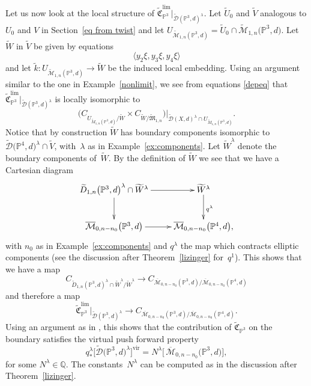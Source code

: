 \documentclass[pdftex]{sigma}
\numberwithin{equation}{section}
\newcommand{\vv}{\mathrm{vir}}
\newcommand{\PP}{\mathbb P}
\theoremstyle{plain}
\theoremstyle{definition}
\theoremstyle{remark}
\begin{document}
\begin{Remark}
Let us now look at the local structure of $\widetilde{\mathfrak{C}}_{\PP^3}^{\mathrm{lim}}|_{\widetilde{\mathcal{D}}(\PP^3,d)^{\lambda}}$. Let $\widetilde{U}_0$ and $\widetilde{V}$ analogous to $U_0$ and $V$ in Section~\ref{eq from twist} and let $U_{\widetilde{\mathcal{M}}_{1,n}(\PP^3,d)}=\widetilde{U}_0\cap \widetilde{\mathcal{M}}_{1,n}\big(\PP^3,d\big)$. Let $\widetilde{W}$ in $\widetilde{V}$ be given by equations
\[\langle y_2\xi,y_3\xi,y_4\xi \rangle
\]
and let $\tilde{k}\colon U_{\widetilde{\mathcal{M}}_{1,n}(\PP^3,d)}\to \widetilde{W}$ be the induced local embedding. Using an argument similar to the one in Example~\ref{nonlimit}, we see from equations \ref{depeq} that $\widetilde{\mathfrak{C}}_{\PP^3}^{\mathrm{lim}}|_{\widetilde{\mathcal{D}}(\PP^3,d)^{\lambda}}$ is locally isomorphic to
\[
\big(C_{U_{\widetilde{M}_{1,n}(\PP^3,d)}/\widetilde{W}}\times C_{\widetilde{W}/\widetilde{\mathfrak{M}}_{1,n}}\big)|_{\widetilde{\mathcal{D}}(X,d)^{\lambda}\cap U_{\widetilde{M}_{1,n}(\PP^3,d)}}.
\]
Notice that by construction $\widetilde{W}$ has boundary components isomorphic to $\widetilde{\mathcal{D}}\big(\PP^4,d\big)^{\lambda}\cap \widetilde{V}$, with~$\lambda$ as in Example~\ref{ex:components}. Let $\widetilde{W}^{\lambda}$ denote the boundary components of~$\widetilde{W}$. By the definition of $\widetilde{W}$ we see that we have a Cartesian diagram
\[\xymatrix{
\widetilde{D}_{1,n}\big(\PP^3,d\big)^{\lambda}\cap \widetilde{W}^{\lambda}\ar[r]\ar[d] &\widetilde{W}^{\lambda}\ar[d]^{q^{\lambda}}\\
\overline{\mathcal{M}}_{0,n-n_0}\big(\PP^3,d\big)\ar[r]&\overline{\mathcal{M}}_{0,n-n_0}\big(\PP^4,d\big),
}
\]
with $n_0$ as in Example~\ref{ex:components} and $q^{\lambda}$ the map which contracts elliptic components (see the discussion after Theorem~\ref{lizinger} for~$q^1$). This shows that we have a map
\[C_{\widetilde{D}_{1,n}(\PP^3,d)^{\lambda}\cap \widetilde{W}^{\lambda}/\widetilde{W}^{\lambda}}\to C_{\overline{\mathcal{M}}_{0,n-n_0}(\PP^3,d)/\overline{\mathcal{M}}_{0,n-n_0}(\PP^4,d)}
\]
and therefore a map
\[
\widetilde{\mathfrak{C}}^{\mathrm{lim}}_{\PP^3}|_{\widetilde{\mathcal{D}}(\PP^3,d)^{\lambda}}\to C_{\overline{\mathcal{M}}_{0,n-n_0}(\PP^3,d)/\overline{\mathcal{M}}_{0,n-n_0}(\PP^4,d)}.
\]
Using an argument as in \cite[Lemma~4.4]{vir-push}, this shows that the contribution of $\widetilde{\mathfrak{C}}_{\PP^3}$ on the boundary satisfies the virtual push forward property
\[q^{\lambda}_*\big[\widetilde{\mathcal{D}}\big(\PP^3,d\big)^{\lambda}\big]^{\vv}=N^{\lambda} \big[\,\overline{\mathcal{M}}_{0,n-n_0}\big(\PP^3,d\big)\big],
\]
for some $N^{\lambda}\in \mathbb Q$. The constants~$N^{\lambda}$ can be computed as in the discussion after Theorem~\ref{lizinger}.


\end{Remark}
\end{document}
